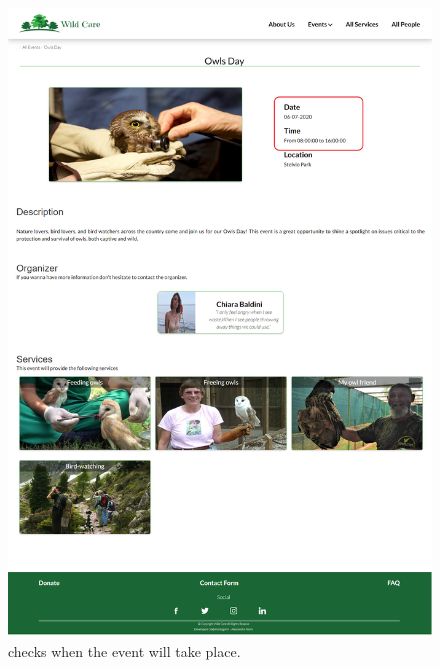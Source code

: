 	\begin{figure}[h!]
		\centering
		\begin{minipage}[b]{1\textwidth}
    			\includegraphics[width=\textwidth]{./assets/mockups/eventdetails_date.png}
			\caption{checks when the event will take place.}
		\end{minipage}
	\end{figure}
